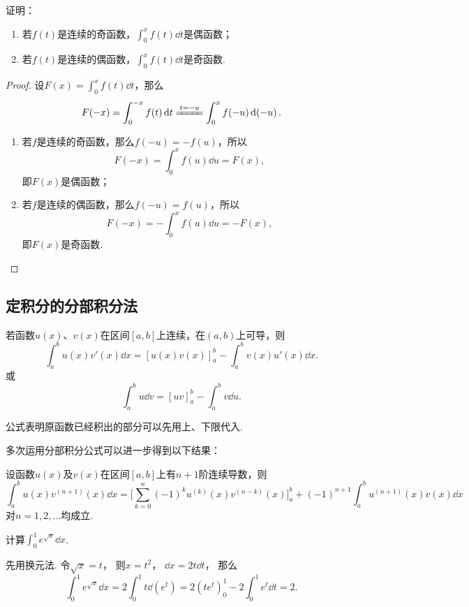 \begin{example}
证明：\begin{enumerate}
	\item 若\(f(t)\)是连续的奇函数，\(\int_0^x f(t) \dd{t}\)是偶函数；
	\item 若\(f(t)\)是连续的偶函数，\(\int_0^x f(t) \dd{t}\)是奇函数.
\end{enumerate}
\begin{proof}
设\(F(x) = \int_0^x f(t) \dd{t}\)，那么\[
F(-x) = \int_0^{-x} f(t) \dd{t}
\xlongequal{t=-u} \int_0^x f(-u) \dd(-u).
\]
\begin{enumerate}
\item 若\(f\)是连续的奇函数，那么\(f(-u) = -f(u)\)，所以\[
F(-x) = \int_0^x f(u) \dd{u} = F(x),
\]即\(F(x)\)是偶函数；

\item 若\(f\)是连续的偶函数，那么\(f(-u) = f(u)\)，所以\[
F(-x) = -\int_0^x f(u) \dd{u} = -F(x),
\]即\(F(x)\)是奇函数.
\qedhere
\end{enumerate}
\end{proof}
\end{example}

\subsection{定积分的分部积分法}
\begin{theorem}
若函数\(u(x)\)、\(v(x)\)在区间\([a,b]\)上连续，在\((a,b)\)上可导，则\[
\int_a^b u(x) v'(x) \dd{x} = [u(x) v(x)]_a^b - \int_a^b v(x) u'(x) \dd{x}.
\]或\[
\int_a^b u \dd{v} = [uv]_a^b - \int_a^b v \dd{u}.
\]
\end{theorem}
公式表明原函数已经积出的部分可以先用上、下限代入.

多次运用分部积分公式可以进一步得到以下结果：
\begin{corollary}
设函数\(u(x)\)及\(v(x)\)在区间\([a,b]\)上有\(n+1\)阶连续导数，则\[
\int_a^b u(x) v^{(n+1)}(x) \dd{x}
= \biggl[
\sum_{k=0}^n (-1)^k u^{(k)}(x) v^{(n-k)}(x)
\biggr]_a^b + (-1)^{n+1} \int_a^b u^{(n+1)}(x) v(x) \dd{x}
\]对\(n=1,2,\dotsc\)均成立.
\end{corollary}

\begin{example}
计算\(\int_0^1 e^{\sqrt{x}} \dd{x}\).
\begin{solution}
先用换元法.
令\(\sqrt{x}=t\)，
则\(x=t^2\)，
\(\dd{x} = 2t\dd{t}\)，
那么\[
	\int_0^1 e^{\sqrt{x}} \dd{x}
	= 2 \int_0^1 t \dd(e^t)
	= 2 (t e^t)_0^1 - 2 \int_0^1 e^t \dd{t}
	= 2.
\]
\end{solution}
\end{example}

